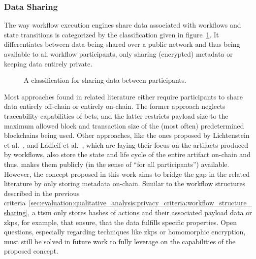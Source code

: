 \subsubsection{Data Sharing}
\label{sec:evaluation:qualitative_analysis:privacy_criteria:data_sharing}
The way workflow execution engines share data associated with workflows and state transitions is categorized by the classification given in figure~\ref{fig:evaluation:qualitative_analysis:data_sharing_classes}. It differentiates between data being shared over a public network and thus being available to all workflow participants, only sharing (encrypted) metadata or keeping data entirely private.

\begin{figure}[h]
    \caption{A classification for sharing data between participants.}
    \label{fig:evaluation:qualitative_analysis:data_sharing_classes}
\end{figure}

Most approaches found in related literature either require participants to share data entirely off-chain or entirely on-chain. The former approach neglects traceability capabilities of \glspl{bct}, and the latter restricts payload size to the maximum allowed block and transaction size of the (most often) predetermined blockchains being used. Other approaches, like the ones proposed by Lichtenstein et al.~\cite{data_driven_choreography_data_reusability_lichtenstein}, and Ladleif et al.~\cite{modeling_blockchain_based_choreographies}, which are laying their focus on the artifacts produced by workflows, also store the state and life cycle of the entire artifact on-chain and thus, makes them publicly (in the sense of ``for all participants'') available. However, the concept proposed in this work aims to bridge the gap in the related literature by only storing metadata on-chain. Similar to the workflow structures described in the previous criteria~\ref{sec:evaluation:qualitative_analysis:privacy_criteria:workflow_structure_sharing}, a \gls{ttsm} only stores hashes of actions and their associated payload data or \glspl{zkp}, for example, that ensure, that the data fulfills specific properties. Open questions, especially regarding techniques like \glspl{zkp} or homomorphic encryption, must still be solved in future work to fully leverage on the capabilities of the proposed concept.

